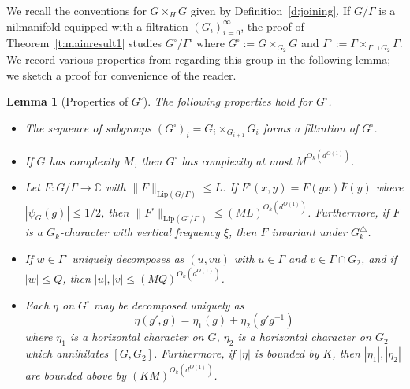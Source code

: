 \documentclass[11pt, a4paper]{amsart}
\theoremstyle{plain}
\theoremstyle{plain}
\newtheorem{lemma}{Lemma}
\theoremstyle{definition}
\theoremstyle{remark}
\numberwithin{equation}{section}
\numberwithin{lemma}{section}
\numberwithin{proposition}{section}
\numberwithin{corollary}{section}
\numberwithin{definition}{section}
\numberwithin{claim}{section}
\begin{document}
We recall the conventions for $G \times_H G$ given by Definition~\ref{d:joining}. If $G/\Gamma$ is a nilmanifold equipped with a filtration $(G_i)_{i = 0}^\infty$, the proof of Theorem~\ref{t:mainresult1} studies $G^\square/\Gamma^\square$ where $G^\square := G \times_{G_2} G$ and $\Gamma^\square := \Gamma \times_{\Gamma \cap G_2} \Gamma$. We record various properties from \cite[Proposition 7.2, Lemma 7.4, Lemma 7.5]{GT12} regarding this group in the following lemma; we sketch a proof for convenience of the reader.
\begin{lemma}[Properties of $G^\square$]\label{l:annoyingcomplexitybounds}
The following properties hold for $G^\square$.
\begin{itemize}
    \item The sequence of subgroups $(G^\square)_i = G_i \times_{G_{i + 1}} G_i$ forms a filtration of $G^\square$.
    \item If $G$ has complexity $M$, then $G^\square$ has complexity at most $M^{O_k(d^{O(1)})}$. 
    \item Let $F\colon G/\Gamma \to \mathbb{C}$ with $\|F\|_{\mathrm{Lip}(G/\Gamma)} \le L$. If $F^\square(x, y) = F(gx)\overline{F}(y)$ where $|\psi_G(g)| \le 1/2$, then $\|F^\square\|_{\mathrm{Lip}(G^\square/\Gamma^\square)} \le (ML)^{O_k(d^{O(1)})}$. Furthermore, if $F$ is a $G_k$-character with vertical frequency $\xi$, then $F$ invariant under $G_k^\triangle$.
    \item If $w \in \Gamma^\square$ uniquely decomposes as $(u, vu)$ with $u \in \Gamma$ and $v \in \Gamma \cap G_2$, and if $|w| \le Q$, then $|u|, |v| \le (MQ)^{O_k(d^{O(1)})}$.  
    \item Each $\eta$ on $G^\square$ may be decomposed uniquely as
    $$\eta(g', g) = \eta_1(g) + \eta_2(g'g^{-1})$$
    where $\eta_1$ is a horizontal character on $G$, $\eta_2$ is a horizontal character on $G_2$ which annihilates $[G, G_2]$. Furthermore, if $|\eta|$ is bounded by $K$, then $|\eta_1|, |\eta_2|$ are bounded above by $(KM)^{O_k(d^{O(1)})}$.
\end{itemize}
\end{lemma}
\end{document}
